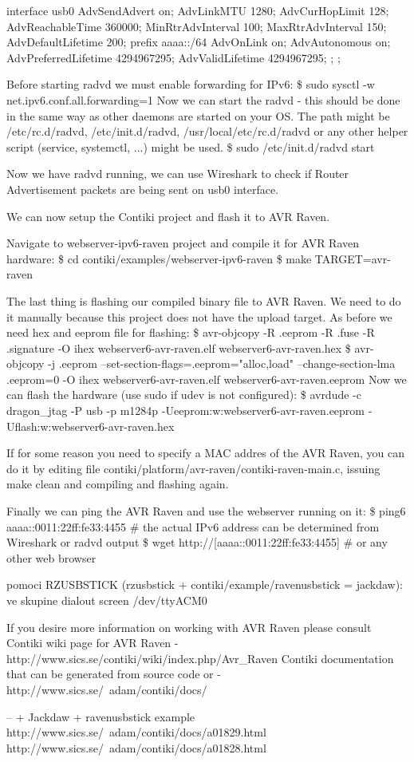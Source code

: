 \documentclass{article}
\begin{document}
interface usb0
{
    AdvSendAdvert on;
    AdvLinkMTU 1280;
    AdvCurHopLimit 128;
    AdvReachableTime 360000;
    MinRtrAdvInterval 100;
    MaxRtrAdvInterval 150;
    AdvDefaultLifetime 200;
    prefix aaaa::/64
    {
        AdvOnLink on;
        AdvAutonomous on;
        AdvPreferredLifetime 4294967295; 
        AdvValidLifetime 4294967295; 
    };
};


Before starting radvd we must enable forwarding for IPv6:
\$ sudo sysctl -w net.ipv6.conf.all.forwarding=1
Now we can start the radvd - this should be done in the same way as other daemons are started on your OS.
The path might be /etc/rc.d/radvd, /etc/init.d/radvd, /usr/local/etc/rc.d/radvd or any other helper script (service, systemctl, ...) might be used.
\$ sudo /etc/init.d/radvd start

Now we have radvd running, we can use Wireshark to check if Router Advertisement packets are being sent on usb0 interface.


We can now setup the Contiki project and flash it to AVR Raven.

Navigate to webserver-ipv6-raven project and compile it for AVR Raven hardware:
\$ cd contiki/examples/webserver-ipv6-raven
\$ make TARGET=avr-raven


The last thing is flashing our compiled binary file to AVR Raven. We need to do it manually because this project does not have the upload target.
As before we need hex and eeprom file for flashing:
\$ avr-objcopy -R .eeprom -R .fuse -R .signature -O ihex webserver6-avr-raven.elf webserver6-avr-raven.hex
\$ avr-objcopy -j .eeprom --set-section-flags=.eeprom="alloc,load" --change-section-lma .eeprom=0 -O ihex webserver6-avr-raven.elf webserver6-avr-raven.eeprom
Now we can flash the hardware (use sudo if udev is not configured):
\$ avrdude -c dragon\_jtag -P usb -p m1284p -Ueeprom:w:webserver6-avr-raven.eeprom -Uflash:w:webserver6-avr-raven.hex


If for some reason you need to specify a MAC addres of the AVR Raven, you can do it by editing file contiki/platform/avr-raven/contiki-raven-main.c,
issuing make clean and compiling and flashing again.


Finally we can ping the AVR Raven and use the webserver running on it:
\$ ping6 aaaa::0011:22ff:fe33:4455              \# the actual IPv6 address can be determined from Wireshark or radvd output
\$ wget http://[aaaa::0011:22ff:fe33:4455]      \# or any other web browser


pomoci RZUSBSTICK (rzusbstick + contiki/example/ravenusbstick = jackdaw):
ve skupine dialout
screen /dev/ttyACM0



If you desire more information on working with AVR Raven please consult
Contiki wiki page for AVR Raven - http://www.sics.se/contiki/wiki/index.php/Avr\_Raven
Contiki documentation that can be generated from source code or - http://www.sics.se/~adam/contiki/docs/

-- + Jackdaw + ravenusbstick example
http://www.sics.se/~adam/contiki/docs/a01829.html
http://www.sics.se/~adam/contiki/docs/a01828.html
\end{document}
